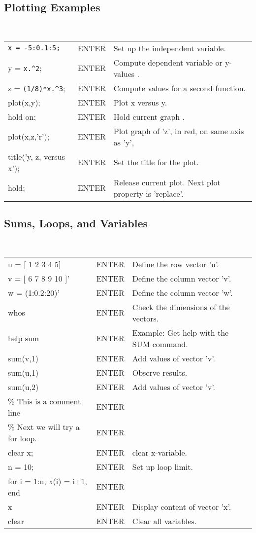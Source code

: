 \subsection{Plotting Examples}  ~

\begin{tabular}{lll}
  \ttt{>>} \verb!x = -5:0.1:5;!  &ENTER  &Set up the independent variable. \\
  \ttt{>>} y = \verb!x.^2!; &ENTER  & Compute dependent variable or
  y-values . \\ 
  \ttt{>>} z = \verb!(1/8)*x.^3!;      &ENTER  & Compute values for
  a second function. \\ 
  \ttt{>>} plot(x,y);     &ENTER  & Plot x versus y. \\
  \ttt{>>} hold on;      &ENTER &Hold current graph . \\
  \ttt{>>} plot(x,z,'r'); &ENTER &Plot graph of 'z', in red, on same
  axis as 'y', \\
  \ttt{>>} title('y, z, versus x'); & ENTER & Set the title for the
  plot. \\
  \ttt{>>} hold;         &ENTER &Release current plot.  Next plot
  property is 'replace'. \\ 
\end{tabular}

\subsection{Sums, Loops, and Variables} ~ 

\begin{tabular}{lll}
  \ttt{>>} u = [ 1 2 3 4 5]  &ENTER &Define the row vector 'u'. \\
  \ttt{>>} v = [ 6 7 8 9 10 ]' &ENTER &Define the column vector 'v'.\\
  \ttt{>>} w = (1:0.2:20)' &ENTER & Define the column vector 'w'. \\
  \ttt{>>} whos     &ENTER &Check the dimensions of the vectors. \\
  \ttt{>>} help sum &ENTER &  Example:  Get help with the
  SUM command. \\ 
  \ttt{>>} sum(v,1) &ENTER &Add values of  vector 'v'.\\
  \ttt{>>} sum(u,1) &ENTER &Observe results. \\ 
  \ttt{>>} sum(u,2) &ENTER & Add values of vector 'v'. \\
  \ttt{>>} \%  This is a comment line  &ENTER & \\  
  \ttt{>>} \%  Next we will try a for loop. &ENTER & \\
  \ttt{>>} clear x; &ENTER &  clear x-variable.  \\      
  \ttt{>>} n = 10;  &ENTER &Set up loop limit. \\
  \ttt{>>} for i = 1:n, x(i) = i+1, end  &ENTER  & \\
  \ttt{>>} x   &ENTER &Display content of vector 'x'. \\
  \ttt{>>} clear &ENTER & Clear all variables. \\
\end{tabular}

